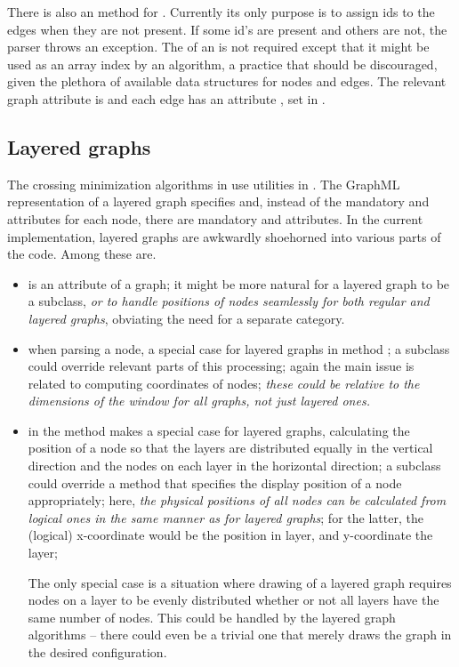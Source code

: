 There is also an  method for
. Currently its only purpose is to assign ids to the edges
when they are not present.
If some id's are present and others are not, the parser throws an exception.
The  of an  is not required except
that it might be used as an array index by an algorithm, a practice
that should be discouraged, given the plethora of available data
structures for nodes and edges.
The relevant graph attribute is 
and each edge has an attribute , set in
.

\subsection{Layered graphs}

The crossing
minimization algorithms in  use
utilities in .
The GraphML representation of a layered graph specifies 
and, instead of the mandatory  and  attributes for each node,
there are mandatory  and  attributes. In the
current implementation, layered graphs are awkwardly shoehorned into various
parts of the code. Among these are.

\begin{itemize}
\item {} is an attribute of a graph; it might be more natural for
  a layered graph to be a subclass, \emph{or to handle positions of
    nodes seamlessly for both regular and layered graphs}, obviating
  the need for a separate category.
\item when parsing a node, a special case for layered graphs in method
  ; a subclass  could
  override relevant parts of this processing; again the main issue is
  related to computing coordinates of nodes; \emph{these could be
    relative to the dimensions of the window for all graphs, not just
    layered ones.}
\item in  the method  makes a special
  case for layered graphs, calculating the position of a node so that the
  layers are distributed equally in the vertical direction and the nodes on
  each layer in the horizontal direction; a subclass could override a method
  that specifies the display position of a node appropriately; here,
  \emph{the physical positions of all nodes can be
    calculated from logical ones in the same manner as for layered
    graphs};
  for the latter, the (logical) x-coordinate would be the position in
  layer, and y-coordinate the layer;
  
  The only special case is a situation where drawing of a layered graph
  requires nodes on a layer to be evenly distributed whether or not
  all layers have the same number of nodes. This could be handled by
  the layered graph algorithms -- there could even be a trivial one
  that merely draws the graph in the desired configuration.
\end{itemize}


